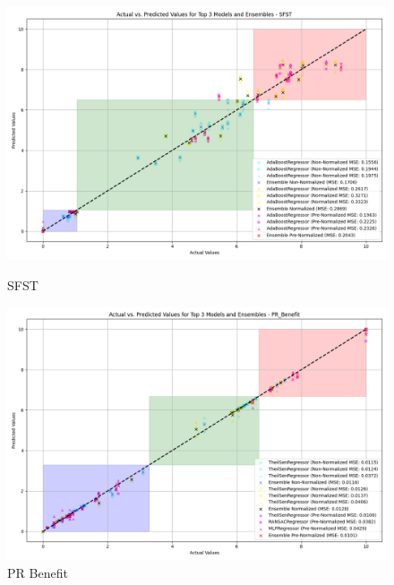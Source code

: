 \begin{figure}[H]
    \centering
    \begin{minipage}{0.45\textwidth}
        \centering
        \includegraphics[width=\linewidth]{reg_section_specific/ensemble_learning/actual_vs_predicted_top_3_models_and_ensembles_SFST.png}
        \caption{SFST}
        \label{reg_spec_fig:sfst_ensemble}
    \end{minipage}\hfill
    \begin{minipage}{0.45\textwidth}
        \centering
        \includegraphics[width=\linewidth]{reg_section_specific/ensemble_learning/actual_vs_predicted_top_3_models_and_ensembles_PR_Benefit.png}
        \caption{PR Benefit}
        \label{reg_spec_fig:pr_ben_ensemble}
    \end{minipage}
\end{figure}

